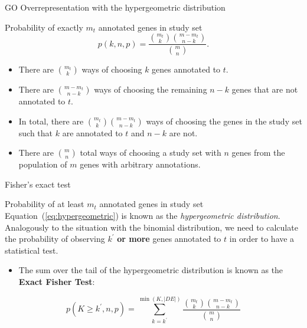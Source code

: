 \documentclass{beamer}
\begin{document}
\begin{frame}{GO Overrepresentation with the hypergeometric distribution}
\begin{mybluebox}{Probability of exactly $m_t$ annotated genes in study set}
 \begin{equation}
p(k,n,p)  = \dfrac{\binom{m_t}{k}\binom{m-m_t}{n-k}}{\binom{m}{n}}.
\end{equation}
\end{mybluebox}

\begin{itemize}
 \item There are $\binom{m_t}{k}$ ways of
choosing $k$ genes annotated to $t$.
\item There are $\binom{m-m_t}{n-k}$
ways of choosing the remaining $n-k$ genes that are not annotated to
$t$.
\item   In total, there are $\binom{m_t}{k}\binom{m-m_t}{n-k}$ ways of
choosing the genes in the study set such that $k$ are annotated to $t$
and $n-k$ are not. 
\item There are $\binom{m}{n}$ total ways of choosing a
study set with $n$ genes from the population of $m$ genes with
arbitrary annotations.
\end{itemize}


 
\end{frame}

\begin{frame}{Fisher's exact test}
\begin{mybluebox}{Probability of at least $m_t$ annotated genes in study set}
Equation~(\ref{eq:hypergeometric}) is known as the \textit{hypergeometric
distribution}. Analogously to the situation with the binomial
distribution, we need to calculate the probability of observing  $k^{'}$ {\bf or more} genes annotated to $t$ in order to have a
statistical test. 
\end{mybluebox}
 \begin{itemize}
 \item The sum over the tail of the
hypergeometric distribution is known as the \textbf{Exact Fisher
  Test}:
 \end{itemize}

\begin{equation}
 \label{eq:exactFisher}
p(K\geq k^{'},n,p) = 
\sum_{k=k^{'}}^{\min(K,|DE|)}\dfrac{\binom{m_t}{k}\binom{m-m_t}{n-k}}{\binom{m}{n}}
\end{equation}
 
 
\end{frame}
\end{document}
